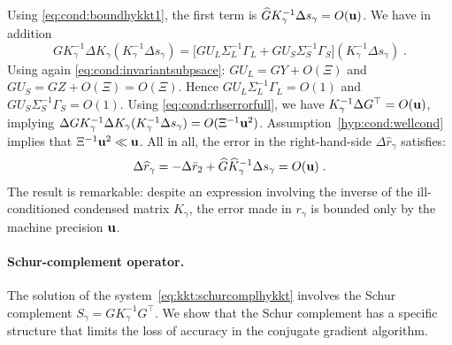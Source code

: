 Using \eqref{eq:cond:boundhykkt1}, the first term is $\widehat{G} K_\gamma^{-1} \Delta s_\gamma = O(\mathbf{u})$.
We have in addition
\begin{equation}
  G K_\gamma^{-1}\Delta K_\gamma (K_\gamma^{-1} \Delta s_\gamma)  =
  \big[ G U_L \Sigma_L^{-1} \Gamma_L + G U_S \Sigma_S^{-1} \Gamma_S \big] (K_\gamma^{-1} \Delta s_\gamma) \; .
\end{equation}
Using again \eqref{eq:cond:invariantsubpsace}:
$G U_L = G Y + O(\Xi)$ and $G U_S = GZ + O(\Xi) = O(\Xi)$. Hence
$G U_L \Sigma_L^{-1} \Gamma_L = O(1)$ and $G U_S \Sigma_S^{-1} \Gamma_S = O(1)$.
Using \eqref{eq:cond:rhserrorfull}, we have $K_\gamma^{-1} \Delta G^\top = O(\mathbf{u})$,
implying $\Delta G K_\gamma^{-1} \Delta K_\gamma (K_\gamma^{-1} \Delta s_\gamma) = O(\Xi^{-1} \mathbf{u}^{2})$.
Assumption~\ref{hyp:cond:wellcond} implies that $\Xi^{-1} \mathbf{u}^2 \ll \mathbf{u}$.
All in all, the error in the right-hand-side $\Delta \widehat{r}_\gamma$ satisfies:
\begin{equation}
  \label{eq:cond:errorrgamma}
  \Delta \widehat{r}_\gamma = -\Delta \bar{r}_2 + \widehat{G} \widehat{K}_\gamma^{-1} \Delta s_\gamma = O(\mathbf{u}) \;.
\end{equation}
The result is remarkable: despite an expression involving the inverse
of the ill-conditioned condensed matrix $K_\gamma$, the error made in $r_\gamma$
is bounded only by the machine precision $\mathbf{u}$.

\paragraph{Schur-complement operator.}
The solution of the system~\eqref{eq:kkt:schurcomplhykkt}
involves the Schur complement $S_\gamma = G K_\gamma^{-1} G^\top$.
We show that the Schur complement
has a specific structure that limits the loss of accuracy
in the conjugate gradient algorithm.

